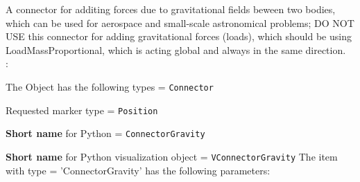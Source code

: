 \ei

%
\newpage


\label{sec:item:ObjectConnectorGravity}
A connector for additing forces due to gravitational fields beween two bodies, which can be used for aerospace and small-scale astronomical problems; DO NOT USE this connector for adding gravitational forces (loads), which should be using LoadMassProportional, which is acting global and always in the same direction.
\vspace{12pt}\\

\noindent {}:
\bi
  \item The Object has the following types = \texttt{Connector}
  \item Requested marker type = \texttt{Position}
  \item {\bf Short name} for Python = \texttt{ConnectorGravity}
  \item {\bf Short name} for Python visualization object = \texttt{VConnectorGravity}
\ei\vspace{12pt} \noindent 
The item  with type = 'ConnectorGravity' has the following parameters:
\vspace{-0.5cm}\\
\vspace{-0.5cm}\\
